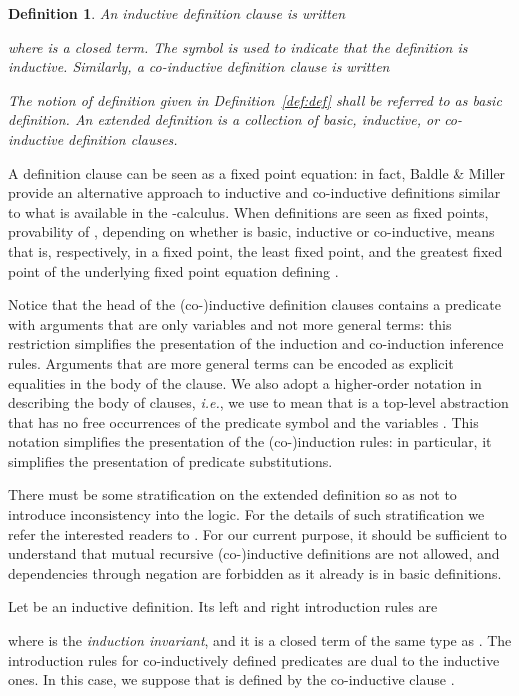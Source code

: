 \documentclass{acmtrans2m}
\newenvironment{definition}{\begin{define} \rm}{\end{define}}
\newtheorem{define}[theorem]{Definition}
\begin{document}
\begin{definition}
An inductive definition clause is written

where  is a closed term. The symbol  is used to indicate
that the definition is inductive. 
Similarly, a co-inductive definition clause is written

The notion of definition given in Definition~\ref{def:def}
shall be referred to as {\em basic definition}.
An {\em extended definition} is a collection of 
basic, inductive, or co-inductive definition clauses.
\end{definition}
A definition clause can be seen as a fixed point 
equation: in fact, Baldle \& Miller \citeyear{baelde07lpar} provide an
alternative approach to inductive and co-inductive definitions similar
to what is available in the -calculus.
When definitions are seen as fixed points, provability of
, depending on whether  is basic, inductive or co-inductive, 
means that  is, respectively, in a fixed point, the least fixed point, and 
the greatest fixed point of the underlying fixed point equation defining .


Notice that the head of the (co-)inductive definition clauses contains
a predicate with arguments that are only variables and not more
general terms: this restriction simplifies the presentation
of the induction and co-induction inference rules.  Arguments that are more
general terms can
be encoded as explicit equalities in the body of the clause.
We also adopt a higher-order notation in describing the body
of clauses, {\em i.e.}, we use  to mean that  is a
top-level abstraction that has
no free occurrences of the predicate symbol  and the variables .
This notation simplifies the presentation of the (co-)induction
rules: in particular, it simplifies the presentation of predicate
substitutions.

There must be some stratification on the extended definition
so as not to introduce inconsistency into the logic.
For the details of such stratification we refer the interested 
readers to \cite{tiu04phd}. For our current purpose, it should be
sufficient to understand that mutual recursive (co-)inductive definitions are
not allowed, and dependencies through negation are forbidden
as it already is in basic definitions.

Let  be an inductive definition. Its left and
right introduction rules are

where  is the {\em induction invariant}, and it is a closed term 
of the same type as . 
The introduction rules for co-inductively defined predicates are dual
to the inductive ones. In this case, we suppose that  is 
defined by the co-inductive clause .
\end{document}

